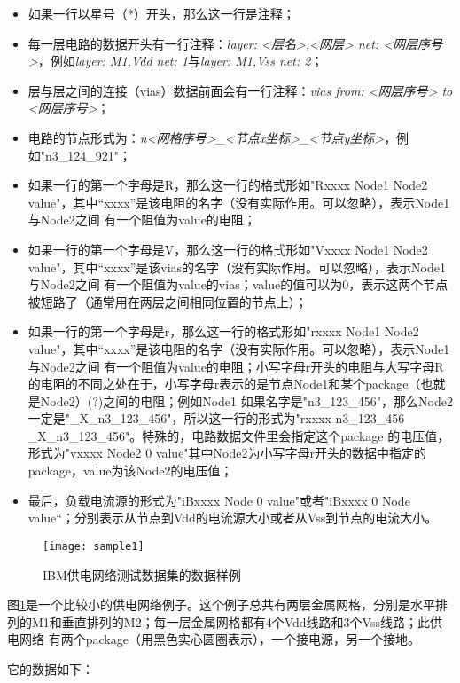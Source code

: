\begin{itemize}
\item 如果一行以星号（*）开头，那么这一行是注释；
\item 每一层电路的数据开头有一行注释：\emph{layer: <层名>,<网层> net: <网层序号>}，例如\emph{layer: M1,Vdd net: 1}与\emph{layer: M1,Vss net: 2}；
\item 层与层之间的连接（vias）数据前面会有一行注释：\emph{vias from: <网层序号> to <网层序号>}；
\item 电路的节点形式为：\emph{n<网格序号>\_<节点x坐标>\_<节点y坐标>}，例如"n3\_124\_921"；
\item 如果一行的第一个字母是R，那么这一行的格式形如"Rxxxx Node1 Node2 value"，其中“xxxx”是该电阻的名字（没有实际作用。可以忽略），表示Node1与Node2之间
有一个阻值为value的电阻；
\item 如果一行的第一个字母是V，那么这一行的格式形如"Vxxxx Node1 Node2 value"，其中“xxxx”是该vias的名字（没有实际作用。可以忽略），表示Node1与Node2之间
有一个阻值为value的vias；value的值可以为0，表示这两个节点被短路了（通常用在两层之间相同位置的节点上）；
\item 如果一行的第一个字母是r，那么这一行的格式形如"rxxxx Node1 Node2 value"，其中“xxxx”是该电阻的名字（没有实际作用。可以忽略），表示Node1与Node2之间
有一个阻值为value的电阻；小写字母r开头的电阻与大写字母R的电阻的不同之处在于，小写字母r表示的是节点Node1和某个package（也就是Node2）(?)之间的电阻；例如Node1
如果名字是"n3\_123\_456"，那么Node2一定是"\_X\_n3\_123\_456"，所以这一行的形式为"rxxxx n3\_123\_456 \_X\_n3\_123\_456"。特殊的，电路数据文件里会指定这个package
的电压值，形式为"vxxxx Node2 0 value"其中Node2为小写字母r开头的数据中指定的package，value为该Node2的电压值；
\item 最后，负载电流源的形式为"iBxxxx Node 0 value"或者"iBxxxx 0 Node value“；分别表示从节点到Vdd的电流源大小或者从Vss到节点的电流大小。
\end{itemize}

\begin{figure}[H]
  \centering
  \texttt{[image: sample1]}
  \caption{IBM供电网络测试数据集的数据样例}
  \label{fig:figsample1}
\end{figure}

图\ref{fig:figsample1}是一个比较小的供电网络例子。这个例子总共有两层金属网格，分别是水平排列的M1和垂直排列的M2；每一层金属网格都有4个Vdd线路和3个Vss线路；此供电网络
有两个package（用黑色实心圆圈表示），一个接电源，另一个接地。

它的数据如下：

